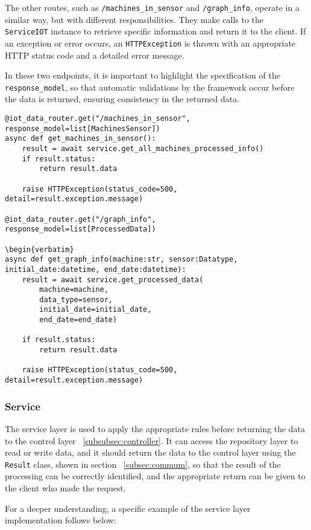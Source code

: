 The other routes, such as \texttt{/machines\_in\_sensor} and \texttt{/graph\_info}, operate in a similar way, but with different responsibilities. They make calls to the \texttt{ServiceIOT} instance to retrieve specific information and return it to the client. If an exception or error occurs, an \texttt{HTTPException} is thrown with an appropriate HTTP status code and a detailed error message.

In these two endpoints, it is important to highlight the specification of the \texttt{response\_model}, so that automatic validations by the framework occur before the data is returned, ensuring consistency in the returned data.

\begin{verbatim}
@iot_data_router.get("/machines_in_sensor", response_model=list[MachinesSensor])
async def get_machines_in_sensor():
    result = await service.get_all_machines_processed_info()
    if result.status:
        return result.data
    
    raise HTTPException(status_code=500, detail=result.exception.message)

@iot_data_router.get("/graph_info", response_model=list[ProcessedData])

\begin{verbatim}
async def get_graph_info(machine:str, sensor:Datatype, initial_date:datetime, end_date:datetime):
    result = await service.get_processed_data(
        machine=machine,
        data_type=sensor,
        initial_date=initial_date,
        end_date=end_date)
    
    if result.status:
        return result.data
    
    raise HTTPException(status_code=500, detail=result.exception.message)
\end{verbatim}

\subsubsection{Service}\label{subsubsec:service}
The service layer is used to apply the appropriate rules before returning the data to the control layer ~\ref{subsubsec:controller}. It can access the repository layer to read or write data, and it should return the data to the control layer using the \texttt{Result} class, shown in section ~\ref{subsec:commum}, so that the result of the processing can be correctly identified, and the appropriate return can be given to the client who made the request.

For a deeper understanding, a specific example of the service layer implementation follows below:

